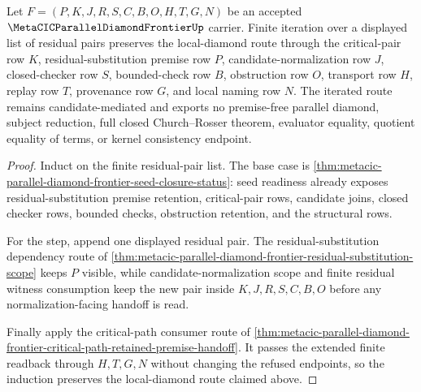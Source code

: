 \begin{theorem}
\label{thm:metacic-parallel-diamond-frontier-residual-join-induction}
Let $F=(P,K,J,R,S,C,B,O,H,T,G,N)$ be an accepted $\MetaCICParallelDiamondFrontierUp$ carrier. Finite iteration over a displayed list of residual pairs preserves the local-diamond route through the critical-pair row $K$, residual-substitution premise row $P$, candidate-normalization row $J$, closed-checker row $S$, bounded-check row $B$, obstruction row $O$, transport row $H$, replay row $T$, provenance row $G$, and local naming row $N$. The iterated route remains candidate-mediated and exports no premise-free parallel diamond, subject reduction, full closed Church--Rosser theorem, evaluator equality, quotient equality of terms, or kernel consistency endpoint.
\end{theorem}
\begin{proof}
Induct on the finite residual-pair list. The base case is \autoref{thm:metacic-parallel-diamond-frontier-seed-closure-status}: seed readiness already exposes residual-substitution premise retention, critical-pair rows, candidate joins, closed checker rows, bounded checks, obstruction retention, and the structural rows.

For the step, append one displayed residual pair. The residual-substitution dependency route of \autoref{thm:metacic-parallel-diamond-frontier-residual-substitution-scope} keeps $P$ visible, while candidate-normalization scope and finite residual witness consumption keep the new pair inside $K,J,R,S,C,B,O$ before any normalization-facing handoff is read.

Finally apply the critical-path consumer route of \autoref{thm:metacic-parallel-diamond-frontier-critical-path-retained-premise-handoff}. It passes the extended finite readback through $H,T,G,N$ without changing the refused endpoints, so the induction preserves the local-diamond route claimed above.
\end{proof}

